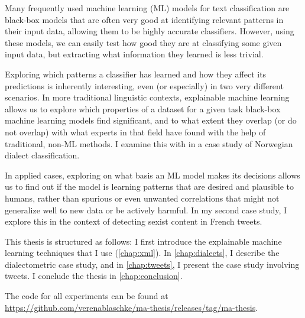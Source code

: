 Many frequently used machine learning (ML) models for text classification are black-box models that are often very good at identifying relevant patterns in their input data, allowing them to be highly accurate classifiers.
However, using these models, we can easily test how good they are at classifying some given input data, but extracting what information they learned is less trivial.

Exploring which patterns a classifier has learned and how they affect its predictions is inherently interesting, even (or especially) in two very different scenarios.
In more traditional linguistic contexts, explainable machine learning allows us to explore which properties of a dataset for a given task black-box machine learning models find significant, and to what extent they overlap (or do not overlap) with what experts in that field have found with the help of traditional, non-ML methods.
I examine this with in a case study of Norwegian dialect classification.

In applied cases, exploring on what basis an ML model makes its decisions allows us to find out if the model is learning patterns that are desired and plausible to humans, rather than spurious or even unwanted correlations that might not generalize well to new data or be actively harmful.
In my second case study, I explore this in the context of detecting sexist content in French tweets.

This thesis is structured as follows:
I first introduce the explainable machine learning techniques that I use (\autoref{chap:xml}).
In \autoref{chap:dialects}, I describe the dialectometric case study, and in \autoref{chap:tweets}, I present the case study involving tweets.
I conclude the thesis in \autoref{chap:conclusion}.

The code for all experiments can be found at \url{https://github.com/verenablaschke/ma-thesis/releases/tag/ma-thesis}.